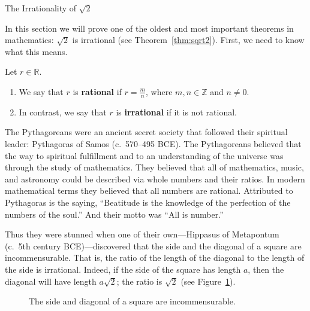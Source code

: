 \begin{section}{The Irrationality of $\sqrt{2}$}\label{sec:Irrationality_of_Root_2}

In this section we will prove one of the oldest and most important theorems in mathematics: $\sqrt{2}$ is irrational (see Theorem~\ref{thm:sqrt2}). First, we need to know what this means.

\begin{definition}
Let $r\in\mathbb{R}$.
\begin{enumerate}[label=\textrm{(\alph*)}]
\item We say that $r$ is \textbf{rational} if $r=\frac{m}{n}$, where $m,n\in\mathbb{Z}$ and $n\neq 0$.
\item In contrast, we say that $r$ is \textbf{irrational} if it is not rational.
\end{enumerate} 
\end{definition}

The Pythagoreans were an ancient secret society that followed their spiritual leader: Pythagoras of Samos (c.\ 570--495 BCE). The Pythagoreans believed that the way to spiritual fulfillment and to an understanding of the universe was through the study of mathematics. They believed that all of mathematics, music, and astronomy could be described via whole numbers and their ratios. In modern mathematical terms they believed that all numbers are rational. Attributed to Pythagoras is the saying, ``Beatitude is the knowledge of the perfection of the numbers of the soul.'' And their motto was ``All is number.''

Thus they were stunned when one of their own---Hippasus of Metapontum (c.~5th century BCE)---discovered that the side and the diagonal of a square are incommensurable. That is, the ratio of the length of the diagonal to the length of the side is irrational. Indeed, if the side of the square has length $a$, then the diagonal will have length $a\sqrt{2}$; the ratio is $\sqrt{2}$ (see Figure~\ref{fig:square}).

\begin{figure}[h!]
\centering
{}
\caption{The side and diagonal of a square are incommensurable.}\label{fig:square}
\end{figure}


\end{section}

